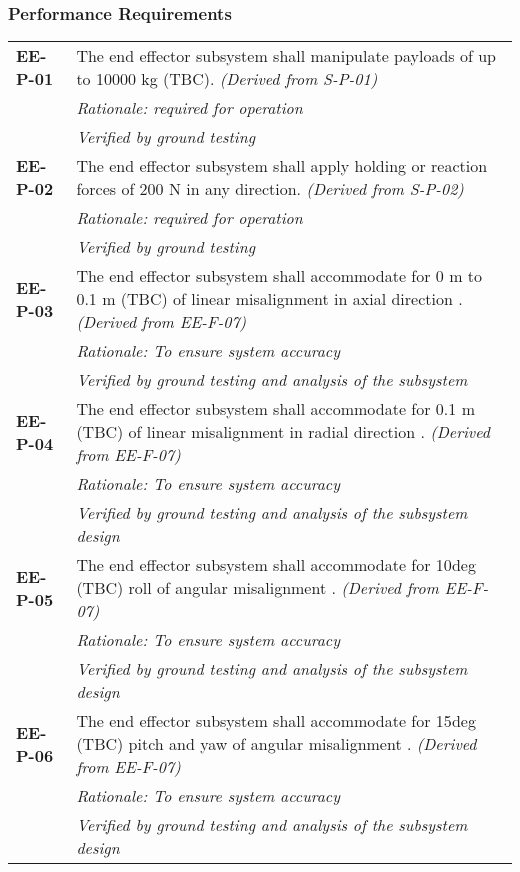 \subsubsection*{Performance Requirements}
\vspace{-15pt}
\begin{longtable}{P{2cm}P{13.25cm}}
\textbf{EE-P-01}	&
The end effector subsystem shall manipulate payloads of up to 10000 \gls{kg} (\gls{TBC}).
\textit{(Derived from S-P-01)} \\
&	\textit{Rationale: required for operation} \\
& \textit{Verified by ground testing}	\\

\textbf{EE-P-02}	&
The end effector subsystem shall apply holding or reaction forces of 200 \gls{N} in any direction.
\textit{(Derived from S-P-02)} \\
&	\textit{Rationale: required for operation} \\
& \textit{Verified by ground testing}	\\

\textbf{EE-P-03}	&
The end effector subsystem shall accommodate for 0 \gls{m} to 0.1 \gls{m} (\gls{TBC}) of linear misalignment in axial direction \cite{NASAsysreq_Kumar}. 
\textit{(Derived from EE-F-07)} \\
&	\textit{Rationale: To ensure system accuracy} \\
&\textit{Verified by ground testing and analysis of the subsystem}	\\

\textbf{EE-P-04}	&
The end effector subsystem shall accommodate for 0.1 \gls{m} (\gls{TBC}) of linear misalignment in radial direction \cite{NASAsysreq_Kumar}. 
 \textit{(Derived from EE-F-07)} \\
&	\textit{Rationale: To ensure system accuracy} \\
& \textit{Verified by ground testing and analysis of the subsystem design}\\

\textbf{EE-P-05}	&
The end effector subsystem shall accommodate for 10\gls{deg} (\gls{TBC}) roll of angular misalignment \cite{NASAsysreq_Kumar}.
 \textit{(Derived from EE-F-07)} \\
&	\textit{Rationale: To ensure system accuracy} \\
& \textit{Verified by ground testing and analysis of the subsystem design}\\

\textbf{EE-P-06}	&
The end effector subsystem shall accommodate for 15\gls{deg} (\gls{TBC}) pitch and yaw of angular misalignment \cite{NASAsysreq_Kumar}.
\textit{(Derived from EE-F-07)} \\
&	\textit{Rationale: To ensure system accuracy} \\
& \textit{Verified by ground testing and analysis of the subsystem design}\\


\end{longtable}
